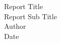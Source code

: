 \begin{titlepage}
    \vspace*{5em}
    \begin{center}
        \huge{Report Title} \\[0.2em]
        \LARGE{Report Sub Title} \\[2em]
        \large{
            Author \\[2em]
            Date
        }
    \end{center}
    \vspace*{\fill}
\end{titlepage}
\restoregeometry